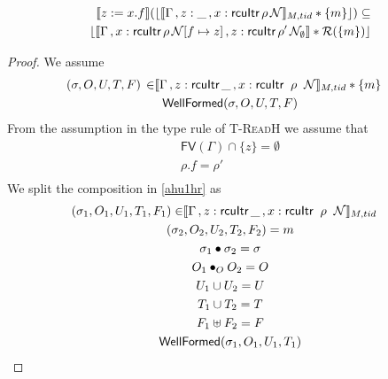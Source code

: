   \begin{lemma}
   \label{lemma:readheap}
\begin{align*}
  \llbracket z:=x.f \rrbracket (\lfloor \llbracket \Gamma\, , z:\_ \, ,  x:\textsf{rcuItr} \, \rho \, \mathcal{N}  \rrbracket_{M,tid} * \{m\}\rfloor)  \subseteq \\
                                                              \lfloor \llbracket \Gamma\,,  x:\textsf{rcuItr} \, \rho \, \mathcal{N}[f\mapsto z]\, ,z:\textsf{rcuItr} \, \rho' \, \mathcal{N}_{\emptyset}  \rrbracket  * \mathcal{R}(\{m\})\rfloor
\end{align*}
 \end{lemma}
 \begin{proof}
We assume
\begin{gather}\label{ahu1hr}
  \begin{aligned}
    (\sigma, O, U, T,F) \, \in &  \llbracket \Gamma\,, z:\textsf{rcuItr}\,\_ \, ,\rcuitrT{x}{G}{k}{k+1}{\_} \rrbracket_{M,tid} * \{m\}
    \end{aligned} \\
\textsf{WellFormed}(\sigma,O,U,T,F)
\label{ahu2hr}
\end{gather}
From the assumption in the type rule of \textsc{T-ReadH} we assume that
\begin{gather}
\textsf{FV}(\Gamma) \cap \{z\}  =\emptyset 
\label{ahu3hr} \\
\rho.f = \rho' 
\label{ahu4hr} \\
\end{gather}
We split the composition in  \ref{ahu1hr} as 
\begin{gather} \label{ahu11hr}
  \begin{aligned}
    (\sigma_1, O_{1}, U_{1}, T_{1} ,F_1) \in & \llbracket  \Gamma\,, z:\textsf{rcuItr}\,\_ \, ,\rcuitrT{x}{G}{k}{k+1}{\_} \rrbracket_{M,tid} \end{aligned}\\
\label{ahu12hr}
(\sigma_2, O_{2}, U_{2}, T_{2},F_2) = m
\\
\label{ahusighr}
\sigma_1 \bullet \sigma_2 = \sigma
\\
\label{ahu13hr}
O_{1} \bullet_{O} O_{2} = O
\\
\label{ahu14hr}
U_{1} \cup U_{2} = U
\\
\label{ahu15hr}
T_{1} \cup T_{2} = T
\\
\label{ahuhrf}
F_1 \uplus F_2 = F
\\
\label{ahu16hr}
\textsf{WellFormed}(\sigma_1,O_{1},U_{1},T_{1})
\\

\end{gather}
\end{proof}
